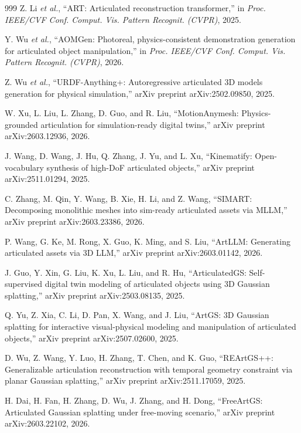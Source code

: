 \documentclass[12pt,a4paper,oneside]{report}
\begin{document}
\begin{thebibliography}{999}
Z. Li \textit{et al.}, ``{ART}: Articulated reconstruction transformer,'' in \textit{Proc. IEEE/CVF Conf. Comput. Vis. Pattern Recognit. (CVPR)}, 2025.

Y. Wu \textit{et al.}, ``{AOMGen}: Photoreal, physics-consistent demonstration generation for articulated object manipulation,'' in \textit{Proc. IEEE/CVF Conf. Comput. Vis. Pattern Recognit. (CVPR)}, 2026.

Z. Wu \textit{et al.}, ``{URDF-Anything+}: Autoregressive articulated {3D} models generation for physical simulation,'' arXiv preprint arXiv:2502.09850, 2025.

W. Xu, L. Liu, L. Zhang, D. Guo, and R. Liu, ``{MotionAnymesh}: Physics-grounded articulation for simulation-ready digital twins,'' arXiv preprint arXiv:2603.12936, 2026.

J. Wang, D. Wang, J. Hu, Q. Zhang, J. Yu, and L. Xu, ``Kinematify: Open-vocabulary synthesis of high-{DoF} articulated objects,'' arXiv preprint arXiv:2511.01294, 2025.

C. Zhang, M. Qin, Y. Wang, B. Xie, H. Li, and Z. Wang, ``{SIMART}: Decomposing monolithic meshes into sim-ready articulated assets via {MLLM},'' arXiv preprint arXiv:2603.23386, 2026.

P. Wang, G. Ke, M. Rong, X. Guo, K. Ming, and S. Liu, ``ArtLLM: Generating articulated assets via {3D} LLM,'' arXiv preprint arXiv:2603.01142, 2026.

J. Guo, Y. Xin, G. Liu, K. Xu, L. Liu, and R. Hu, ``{ArticulatedGS}: Self-supervised digital twin modeling of articulated objects using {3D} Gaussian splatting,'' arXiv preprint arXiv:2503.08135, 2025.

Q. Yu, Z. Xia, C. Li, D. Pan, X. Wang, and J. Liu, ``{ArtGS}: {3D} Gaussian splatting for interactive visual-physical modeling and manipulation of articulated objects,'' arXiv preprint arXiv:2507.02600, 2025.

D. Wu, Z. Wang, Y. Luo, H. Zhang, T. Chen, and K. Guo, ``{REArtGS++}: Generalizable articulation reconstruction with temporal geometry constraint via planar Gaussian splatting,'' arXiv preprint arXiv:2511.17059, 2025.

H. Dai, H. Fan, H. Zhang, D. Wu, J. Zhang, and H. Dong, ``{FreeArtGS}: Articulated Gaussian splatting under free-moving scenario,'' arXiv preprint arXiv:2603.22102, 2026.


\end{thebibliography}
\end{document}

